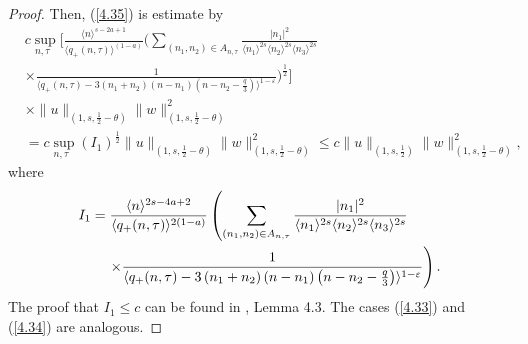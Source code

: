 \documentclass[reqno]{amsart}
\numberwithin{equation}{section}
\begin{document}
\begin{proof}
Then, (\ref{4.35}) is estimate by
\begin{equation}\label{4.39}
\begin{split}
&\underset{n,\tau}{c\sup}\Big[\frac{\langle n\rangle^{s-2a+1}}{\langle q_{+}(n,\tau)\rangle^{(1-a)}}
\Big(\sum\limits_{(n_{1},n_{2})\in A_{n,\tau}}
\frac{|n_1|^2}{\langle n_{1}\rangle^{2s}\langle n_{2}\rangle^{2s}\langle n_3\rangle^{2s}}\\
&\times
\frac{1}{\langle q_{+}(n,\tau)-3(n_{1}+n_{2})(n-n_1)(n-n_2-\frac{q}{3})\rangle^{1-\varepsilon}}
\Big)^{\frac{1}{2}}\Big]\\
&\times\|u\| _{(1,s,\frac12-\theta)}\| w\| _{(1,s,\frac12-\theta)}^{2}\\
&  =\underset{n,\tau}{c\sup}\left(  I_{1}\right) ^{\frac{1}{2}}\|
u\| _{(1,s,\frac12-\theta)}\| w\| _{(1,s,\frac12-\theta)}^{2}\leq
c\|u\| _{(1,s,\frac12 )}\| w\| _{(1,s,\frac12-\theta)}^2,
\end{split}
\end{equation}
where
\begin{equation*}
\begin{split}
I_{1}  &  =\frac{\langle n\rangle^{2s-4a+2}}{\langle q_{+}(n,\tau
)\rangle^{2(1-a)}}\left(  \sum\limits_{(n_{1},n_{2})\in A_{n,\tau}}\frac{|n_1| ^{2}}{\langle n_{1}\rangle^{2s}\langle
n_{2}\rangle^{2s}\langle n_3\rangle^{2s}}\right. \\
&  \left. \hspace{0.4cm} \times\frac{1}{\langle q_{+}(n,\tau)-3\left(
n_{1}+n_{2}\right) \left(  n-n_{1}\right)  \left(
n-n_{2}-\frac{q}{3}\right)  \rangle
^{1-\varepsilon}}\right).
\end{split}
\end{equation*}
The proof that  $I_{1}\leq c$ can be found in  \cite{38}, Lemma
4.3. The cases (\ref{4.33}) and (\ref{4.34}) are analogous.


\end{proof}
\end{document}
